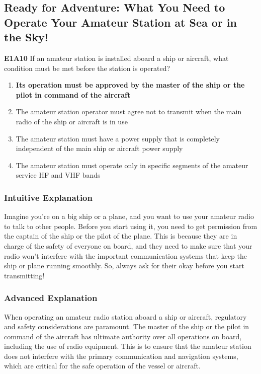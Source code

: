 \subsection{Ready for Adventure: What You Need to Operate Your Amateur Station at Sea or in the Sky!}

\begin{tcolorbox}[colback=gray!10!white,colframe=black!75!black,title=Multiple Choice Question]
    \textbf{E1A10} If an amateur station is installed aboard a ship or aircraft, what condition must be met before the station is operated?
    \begin{enumerate}[label=\Alph*.]
        \item \textbf{Its operation must be approved by the master of the ship or the pilot in command of the aircraft}
        \item The amateur station operator must agree not to transmit when the main radio of the ship or aircraft is in use
        \item The amateur station must have a power supply that is completely independent of the main ship or aircraft power supply
        \item The amateur station must operate only in specific segments of the amateur service HF and VHF bands
    \end{enumerate}
\end{tcolorbox}

\subsubsection*{Intuitive Explanation}
Imagine you're on a big ship or a plane, and you want to use your amateur radio to talk to other people. Before you start using it, you need to get permission from the captain of the ship or the pilot of the plane. This is because they are in charge of the safety of everyone on board, and they need to make sure that your radio won't interfere with the important communication systems that keep the ship or plane running smoothly. So, always ask for their okay before you start transmitting!

\subsubsection*{Advanced Explanation}
When operating an amateur radio station aboard a ship or aircraft, regulatory and safety considerations are paramount. The master of the ship or the pilot in command of the aircraft has ultimate authority over all operations on board, including the use of radio equipment. This is to ensure that the amateur station does not interfere with the primary communication and navigation systems, which are critical for the safe operation of the vessel or aircraft.

